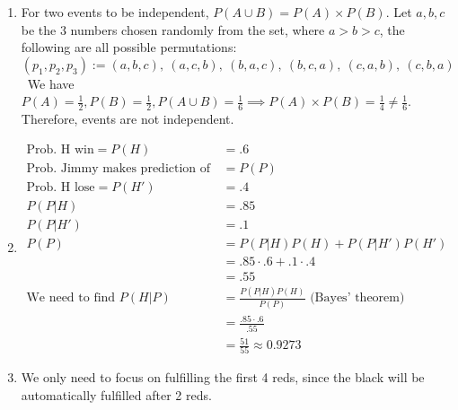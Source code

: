 \documentclass{article}
\begin{document}
\begin{enumerate}[label=(\alph*)]
    \item For two events to be independent, $P(A \cup B) = P(A) \times P(B)$. Let $a,b,c$ be the 3 numbers chosen randomly from the set, where $a>b>c$, the following are all possible permutations:
          \[
              (p_1,p_2,p_3) := (a,b,c),\ (a,c,b),\ (b,a,c),\ (b,c,a),\ (c,a,b),\ (c,b,a)
          \]\
          We have $P(A) = \frac12, P(B) = \frac12, P(A\cup B) = \frac16 \implies P(A)\times P(B) = \frac14 \neq \frac16$. Therefore, events are not independent.
    \item \begin{align*}
              \text{Prob. H win} = P(H)                         & = .6                                               \\
              \text{Prob. Jimmy makes prediction of H team win} & = P(P)                                             \\
              \text{Prob. H lose} = P(H')                       & = .4                                               \\
              P(P | H)                                          & = .85                                              \\
              P(P | H')                                         & = .1                                               \\
              P(P)                                              & = P(P|H)P(H) + P(P|H')P(H')                        \\
                                                                & = .85 \cdot .6 + .1 \cdot .4                       \\
                                                                & = .55                                              \\
              \text{We need to find } P(H|P)                    & = \frac{P(P|H)P(H)}{P(P)} \text{ (Bayes' theorem)} \\
                                                                & = \frac{.85 \cdot .6}{.55}                         \\
                                                                & = \frac{51}{55} \approx 0.9273
          \end{align*}
    \item We only need to focus on fulfilling the first 4 reds, since the black will be automatically fulfilled after 2 reds.

\end{enumerate}
\end{document}
